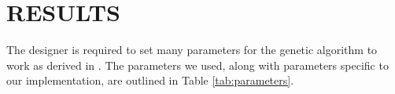 \documentclass[letterpaper, 10 pt, conference]{ieeeconf}  %
\begin{document}
%

\section{RESULTS}\label{results}
The designer is required to set many parameters for the genetic algorithm to work as derived in \cite{Parkinson2019}. The parameters we used, along with parameters specific to our implementation, are outlined in Table \ref{tab:parameters}.
\end{document}
